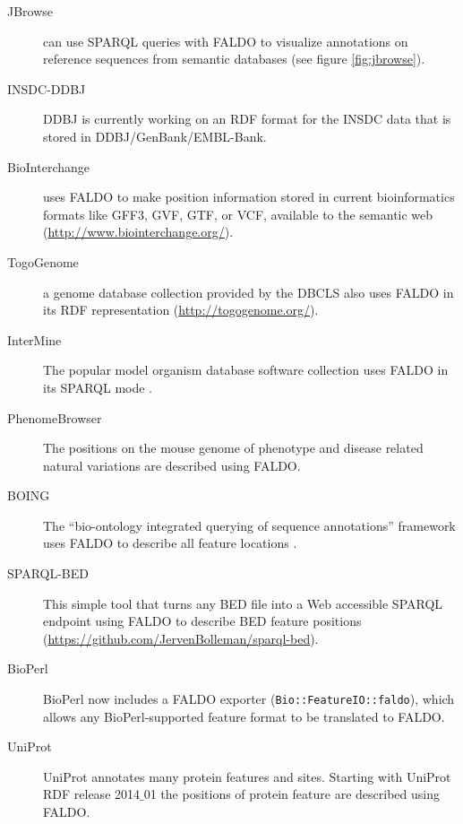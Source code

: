 \begin{description}
\item[JBrowse] can use SPARQL queries with FALDO to visualize annotations on reference sequences from semantic databases \cite{JBrowse} (see figure \ref{fig:jbrowse}).
\item[INSDC-DDBJ] DDBJ is currently working on an RDF format for the INSDC data that is stored in DDBJ/GenBank/EMBL-Bank.
\item[BioInterchange] uses FALDO to make position information stored in current bioinformatics formats like GFF3, GVF, GTF, or VCF, available to the semantic web (\url{http://www.biointerchange.org/}).
\item[TogoGenome] a genome database collection provided by the DBCLS also uses FALDO in its RDF representation (\url{http://togogenome.org/}).
\item[InterMine] The popular model organism database software collection uses FALDO in its SPARQL mode \cite{InterMine}.
\item[PhenomeBrowser] The positions on the mouse genome of phenotype and disease related natural variations are described using FALDO.
\item[BOING] The ``bio-ontology integrated querying of sequence annotations'' framework uses FALDO to describe all feature locations \cite{BOING}.
\item[SPARQL-BED] This simple tool that turns any BED file into a Web accessible SPARQL endpoint using FALDO to describe BED feature positions (\url{https://github.com/JervenBolleman/sparql-bed}).
\item[BioPerl] BioPerl\cite{BioPerl2002} now includes a FALDO exporter (\texttt{Bio::FeatureIO::faldo}), which allows any BioPerl-supported feature format to be translated to FALDO.
\item[UniProt] UniProt annotates many protein features and sites. Starting with UniProt RDF release 2014$\_$01 the positions of protein feature are described using FALDO.
\end{description}

